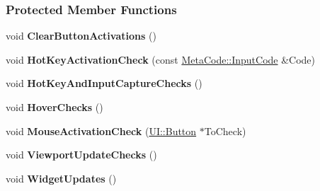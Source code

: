 \subsubsection*{Protected Member Functions}
\begin{DoxyCompactItemize}
\item 
\hypertarget{classMezzanine_1_1UIManager_aa3ade43e619161f471cdc7e7e7516934}{
void {\bfseries ClearButtonActivations} ()}
\label{classMezzanine_1_1UIManager_aa3ade43e619161f471cdc7e7e7516934}

\item 
\hypertarget{classMezzanine_1_1UIManager_af8e6b89de46ca462df709c01f29ebde7}{
void {\bfseries HotKeyActivationCheck} (const \hyperlink{classMezzanine_1_1MetaCode_a3b5633f0145bf3287cf53a3f05b5563c}{MetaCode::InputCode} \&Code)}
\label{classMezzanine_1_1UIManager_af8e6b89de46ca462df709c01f29ebde7}

\item 
\hypertarget{classMezzanine_1_1UIManager_a29cfa15278319a32fcd9a72a169b2b72}{
void {\bfseries HotKeyAndInputCaptureChecks} ()}
\label{classMezzanine_1_1UIManager_a29cfa15278319a32fcd9a72a169b2b72}

\item 
\hypertarget{classMezzanine_1_1UIManager_aa2cd8695b0ac7fda1f026236e4a566e1}{
void {\bfseries HoverChecks} ()}
\label{classMezzanine_1_1UIManager_aa2cd8695b0ac7fda1f026236e4a566e1}

\item 
\hypertarget{classMezzanine_1_1UIManager_a0fc8dfb7ed9ff97074b7a0a5f6f50f33}{
void {\bfseries MouseActivationCheck} (\hyperlink{classMezzanine_1_1UI_1_1Button}{UI::Button} $\ast$ToCheck)}
\label{classMezzanine_1_1UIManager_a0fc8dfb7ed9ff97074b7a0a5f6f50f33}

\item 
\hypertarget{classMezzanine_1_1UIManager_af7fcc5f7129bee162fc55e7acfceca59}{
void {\bfseries ViewportUpdateChecks} ()}
\label{classMezzanine_1_1UIManager_af7fcc5f7129bee162fc55e7acfceca59}

\item 
\hypertarget{classMezzanine_1_1UIManager_a67910b0b5ce851160e950c1ba3812573}{
void {\bfseries WidgetUpdates} ()}
\label{classMezzanine_1_1UIManager_a67910b0b5ce851160e950c1ba3812573}

\end{DoxyCompactItemize}
